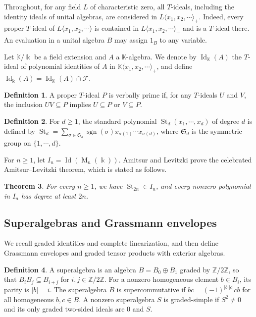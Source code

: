 \documentclass[11pt,reqno]{amsart}
\newcommand{\kk}{\Bbbk}
\newcommand{\KK}{\mathbb{K}}
\newcommand{\F}{\mathcal F}
\newcommand{\Id}{\operatorname{Id}}
\newcommand{\Mat}{\operatorname{M}}
\newcommand{\sgn}{\operatorname{sgn}}
\newcommand{\Ztwo}{\mathbb Z/2\mathbb Z}
\newcommand{\st}{\operatorname{St}}
\newtheorem{theorem}{Theorem}[section]
\theoremstyle{definition}
\newtheorem{definition}[theorem]{Definition}
\theoremstyle{remark}
\numberwithin{equation}{section}
\begin{document}
Throughout, for any field $L$ of characteristic zero,
all $T$-ideals, including the identity ideals of unital
algebras, are considered in
$L\langle x_1,x_2,\cdots\rangle_+$.
Indeed, every proper $T$-ideal of
$L\langle x_1,x_2,\cdots\rangle$
is contained in $L\langle x_1,x_2,\cdots\rangle_+$
and is a $T$-ideal there.
An evaluation in a unital algebra $B$ may assign $1_B$
to any variable.

Let $\KK/\kk$ be a field extension and $A$ a $\KK$-algebra.
We denote by $\Id_{\KK}(A)$ the $T$-ideal of polynomial
identities of $A$ in
$\KK\langle x_1,x_2,\cdots\rangle_+$,
and define $
\Id_{\kk}(A)=\Id_{\KK}(A)\cap\F$.


\begin{definition}\label{def:verbally-prime}
A proper $T$-ideal $P$ is verbally prime if, for any $T$-ideals
$U$ and $V$, the inclusion $UV\subseteq P$ implies
$U\subseteq P$ or $V\subseteq P$.
\end{definition}


\begin{definition}\label{def:standard-polynomial}
For $d\ge1$, the standard polynomial
$\st_d(x_1,\cdots,x_d)$ of degree $d$ is defined by
$\st_d=\sum_{\sigma\in\mathfrak S_d}
\sgn(\sigma)x_{\sigma(1)}\cdots x_{\sigma(d)}$,
where $\mathfrak S_d$ is the symmetric group on
$\{1,\cdots,d\}$.
\end{definition}





For $n\ge1$, let $I_n=\Id(\Mat_n(\kk))$. Amitsur and Levitzki \cite{AmitsurLevitzki1950}  prove the   celebrated  Amitsur--Levitzki theorem, which is stated as follows.
\begin{theorem}\label{thm:amitsur-levitzki}
For every $n\ge1$, we have $\st_{2n}\in I_n$, and every nonzero
polynomial in $I_n$ has  degree at least $2n$.
\end{theorem}

\subsection{Superalgebras and Grassmann envelopes}\label{subsec:superalgebras-envelopes}

We recall graded identities and complete linearization, and then
define Grassmann envelopes and graded tensor products with exterior
algebras.

\begin{definition}\label{def:superalgebras}
A superalgebra is an algebra $B=B_0\oplus B_1$ graded by
$\Ztwo$, so that $B_iB_j\subseteq B_{i+j}$ for $i,j\in\Ztwo$.
For a nonzero homogeneous element $b\in B_i$, its parity is
$|b|=i$.
The superalgebra $B$ is supercommutative if
$
bc=(-1)^{|b||c|}cb
$
for all homogeneous $b,c\in B$.
A nonzero superalgebra $S$ is graded-simple if $S^2\ne0$ and
its only graded two-sided ideals are $0$ and $S$.
\end{definition}
\end{document}
